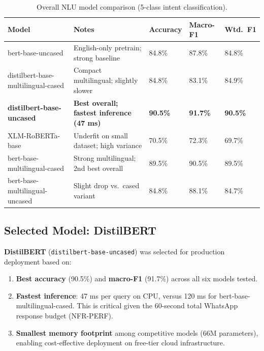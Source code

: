 \begin{table}[H]
\centering
\caption{Overall NLU model comparison (5-class intent classification).}
\label{tab:nlu-results}
\small
\begin{tabularx}{\textwidth}{@{}>{\raggedright\arraybackslash}p{}Y C{0.10\textwidth} C{0.10\textwidth} C{0.10\textwidth}@{}}
\toprule
\textbf{Model} & \textbf{Notes} & {\scriptsize\textbf{Accuracy}} & \textbf{Macro-F1} & \textbf{Wtd.\ F1} \\
\midrule
bert-base-uncased
  & English-only pretrain; strong baseline
  & 84.8\% & 87.8\% & 84.8\% \\
distilbert-base-multilingual-cased
  & Compact multilingual; slightly slower
  & 84.8\% & 83.1\% & 84.9\% \\
\textbf{distilbert-base-uncased}
  & \textbf{Best overall; fastest inference (47 ms)}
  & \textbf{90.5\%} & \textbf{91.7\%} & \textbf{90.5\%} \\
XLM-RoBERTa-base
  & Underfit on small dataset; high variance
  & 70.5\% & 72.3\% & 69.7\% \\
bert-base-multilingual-cased
  & Strong multilingual; 2nd best overall
  & 89.5\% & 90.5\% & 89.5\% \\
bert-base-multilingual-uncased
  & Slight drop vs.\ cased variant
  & 84.8\% & 88.1\% & 84.7\% \\
\bottomrule
\end{tabularx}
\end{table}

\subsection{Selected Model: DistilBERT}

\textbf{DistilBERT} (\texttt{distilbert-base-uncased}) was selected for production
deployment based on:
\begin{enumerate}
  \item \textbf{Best accuracy} (90.5\%) and \textbf{macro-F1} (91.7\%) across all
        six models tested.
  \item \textbf{Fastest inference}: 47 ms per query on CPU, versus
        120 ms for bert-base-multilingual-cased.  This is critical given
        the 60-second total WhatsApp response budget (NFR-PERF).
  \item \textbf{Smallest memory footprint} among competitive models (66M parameters),
        enabling cost-effective deployment on free-tier cloud infrastructure.
\end{enumerate}


